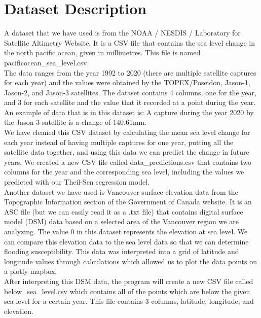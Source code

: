 \documentclass[fontsize=11pt]{article}
\begin{document}
    \section*{Dataset Description}

    \hspace{\parindent}A dataset that we have used is from the NOAA / NESDIS / Laboratory for Satellite Altimetry Website. It is a CSV file that contains the sea level change in the north pacific ocean, given in millimetres. This file is named pacificocean\_sea\_level.csv. \\

    The data ranges from the year 1992 to 2020  (there are multiple satellite captures for each year) and the values were obtained by the TOPEX/Poseidon, Jason-1, Jason-2, and Jason-3 satellites. The dataset contains 4 columns, one for the year, and 3 for each satellite and the value that it recorded at a point during the year. An example of data that is in this dataset is: A capture during the year 2020 by the Jason-3 satellite is a change of 140.61mm. \\

    We have cleaned this CSV dataset by calculating the mean sea level change for each year instead of having multiple captures for one year, putting all the satellite data together, and using this data we can predict the change in future years. We created a new CSV file called data\_predictions.csv that contains two columns for the year and the corresponding sea level, including the values we predicted with our Theil-Sen regression model. \\

    Another dataset we have used is Vancouver surface elevation data from the Topographic Information section of the Government of Canada website. It is an ASC file (but we can easily read it as a .txt file) that contains digital surface model (DSM) data based on a selected area of the Vancouver region we are analyzing. The value 0 in this dataset represents the elevation at sea level. We can compare this elevation data to the sea level data so that we can determine flooding susceptibility. This data was interpreted into a grid of latitude and longitude values through calculations which allowed us to plot the data points on a plotly mapbox. \\

    After interpreting this DSM data, the program will create a new CSV file called below\_sea\_level.csv which contains all of the points which are below the given sea level for a certain year. This file contains 3 columns, latitude, longitude, and elevation. \\
\end{document}
